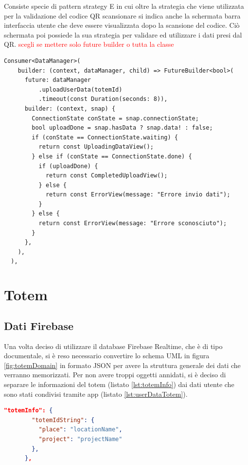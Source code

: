 Consiste specie di pattern strategy E in cui oltre la strategia che viene utilizzata per la validazione del codice QR scansionare si indica anche la schermata barra interfaccia utente che deve essere visualizzata dopo la scansione del codice. Ciò schermata poi possiede la sua strategia per validare ed utilizzare i dati presi dal QR.
\textcolor{red}{scegli se mettere solo future builder o tutta la classe}

 \begin{lstlisting}[style=FlutterStyle, caption={}, label={lst:strategyViewTotem}]
  Consumer<DataManager>(
    builder: (context, dataManager, child) => FutureBuilder<bool>(
      future: dataManager
          .uploadUserData(totemId)
          .timeout(const Duration(seconds: 8)),
      builder: (context, snap) {
        ConnectionState conState = snap.connectionState;
        bool uploadDone = snap.hasData ? snap.data! : false;
        if (conState == ConnectionState.waiting) {
          return const UploadingDataView();
        } else if (conState == ConnectionState.done) {
          if (uploadDone) {
            return const CompletedUploadView();
          } else {
            return const ErrorView(message: "Errore invio dati");
          }
        } else {
          return const ErrorView(message: "Errore sconosciuto");
        }
      },
    ),
  ),
\end{lstlisting}
\section{Totem}
\subsection{Dati Firebase}
Una volta deciso di utilizzare il database Firebase Realtime, che è di tipo documentale, si è reso necessario convertire lo schema UML in figura \ref{fig:totemDomain} in formato JSON per avere la struttura generale dei dati che verranno memorizzati.
Per non avere troppi oggetti annidati, si è deciso di separare le informazioni del totem (listato \ref{lst:totemInfo}) dai dati utente che sono stati condivisi tramite app (listato \ref{lst:userDataTotem}).

\begin{lstlisting}[language=json, caption={Esempio di oggetto JSON contenente le informazioni sui totem}, label={lst:totemInfo}]
    "totemInfo": {
        "totemIdString": {
          "place": "locationName",
          "project": "projectName"
        },
      },
\end{lstlisting}  

